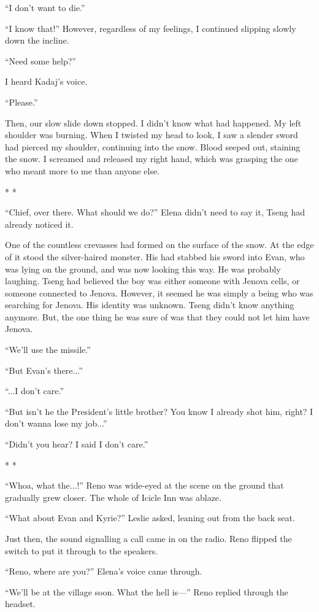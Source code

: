\documentclass[oneside]{book}
\begin{document}
“I don’t want to die.”

“I know that!” However, regardless of my feelings, I continued slipping slowly down the incline.

“Need some help?”

I heard Kadaj’s voice.

“Please.”

Then, our slow slide down stopped. I didn’t know what had happened. My left shoulder was burning. When I twisted my head to look, I saw a slender sword had pierced my shoulder, continuing into the snow. Blood seeped out, staining the snow. I screamed and released my right hand, which was grasping the one who meant more to me than anyone else.

* *

“Chief, over there. What should we do?” Elena didn’t need to say it, Tseng had already noticed it.

One of the countless crevasses had formed on the surface of the snow. At the edge of it stood the silver-haired monster. His had stabbed his sword into Evan, who was lying on the ground, and was now looking this way. He was probably laughing. Tseng had believed the boy was either someone with Jenova cells, or someone connected to Jenova. However, it seemed he was simply a being who was searching for Jenova. His identity was unknown. Tseng didn’t know anything anymore. But, the one thing he was sure of was that they could not let him have Jenova.

“We’ll use the missile.”

“But Evan’s there...”

“...I don’t care.”

“But isn’t he the President’s little brother? You know I already shot him, right? I don’t wanna lose my job...”

“Didn’t you hear? I said I don’t care.”

* *

“Whoa, what the...!” Reno was wide-eyed at the scene on the ground that gradually grew closer. The whole of Icicle Inn was ablaze.

“What about Evan and Kyrie?” Leslie asked, leaning out from the back seat.

Just then, the sound signalling a call came in on the radio. Reno flipped the switch to put it through to the speakers.

“Reno, where are you?” Elena’s voice came through.

“We’ll be at the village soon. What the hell is—” Reno replied through the headset.
\end{document}
